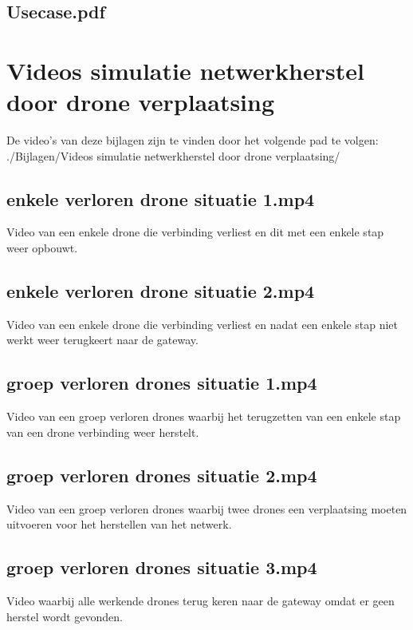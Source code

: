 \documentclass[a4paper, 11pt, oneside]{report}
\begin{document}
\section{Usecase.pdf}\label{app:Usecase}


\chapter{Videos simulatie netwerkherstel door drone verplaatsing}\label{sec:videos-simulatie-netwerkherstel-door-drone-verplaatsing}
De video's van deze bijlagen zijn te vinden door het volgende pad te volgen: \newline
./Bijlagen/Videos simulatie netwerkherstel door drone verplaatsing/
\section{enkele verloren drone situatie 1.mp4}\label{sec:enkele-verloren-drone-situatie-1mp4} Video van een enkele drone die verbinding verliest en dit met een enkele stap weer opbouwt.
\section{enkele verloren drone situatie 2.mp4}\label{sec:enkele-verloren-drone-situatie-2mp4} Video van een enkele drone die verbinding verliest en nadat een enkele stap niet werkt weer terugkeert naar de gateway.
\section{groep verloren drones situatie 1.mp4}\label{sec:groep-verloren-drones-situatie-1mp4} Video van een groep verloren drones waarbij het terugzetten van een enkele stap van een drone verbinding weer herstelt.
\section{groep verloren drones situatie 2.mp4}\label{sec:groep-verloren-drones-situatie-2mp4} Video van een groep verloren drones waarbij twee drones een verplaatsing moeten uitvoeren voor het herstellen van het netwerk.
\section{groep verloren drones situatie 3.mp4}\label{sec:groep-verloren-drones-situatie-3mp4} Video waarbij alle werkende drones terug keren naar de gateway omdat er geen herstel wordt gevonden.
\end{document}

